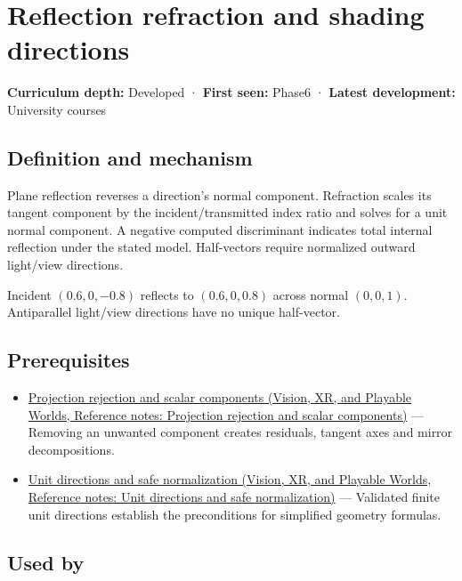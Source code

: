 \hypertarget{appendix-44e00863b4d5}{}\label{referencestart:appendix-44e00863b4d5}
\section{Reflection refraction and shading directions}\label{appendix-44e00863b4d5-reflection-refraction-and-shading-directions}

\textbf{Curriculum depth:} Developed · \textbf{First seen:} Phase6 · \textbf{Latest development:} University courses

\subsection{Definition and mechanism}\label{appendix-44e00863b4d5-definition-and-mechanism}

Plane reflection reverses a direction's normal component. Refraction scales its tangent component by the incident/transmitted index ratio and solves for a unit normal component. A negative computed discriminant indicates total internal reflection under the stated model. Half-vectors require normalized outward light/view directions.

Incident \((0.6,0,-0.8)\) reflects to \((0.6,0,0.8)\) across normal \((0,0,1)\). Antiparallel light/view directions have no unique half-vector.

\subsection{Prerequisites}\label{appendix-44e00863b4d5-prerequisites}

\begin{itemize}
\tightlist
\item
  \href{../07-Vision-XR-and-Playable-Worlds/main.pdf\#nameddest=appendix-505a502c372a}{Projection rejection and scalar components (Vision, XR, and Playable Worlds, Reference notes: Projection rejection and scalar components)} --- Removing an unwanted component creates residuals, tangent axes and mirror decompositions.
\item
  \href{../07-Vision-XR-and-Playable-Worlds/main.pdf\#nameddest=appendix-f744e41b95b4}{Unit directions and safe normalization (Vision, XR, and Playable Worlds, Reference notes: Unit directions and safe normalization)} --- Validated finite unit directions establish the preconditions for simplified geometry formulas.
\end{itemize}

\subsection{Used by}\label{appendix-44e00863b4d5-used-by}

